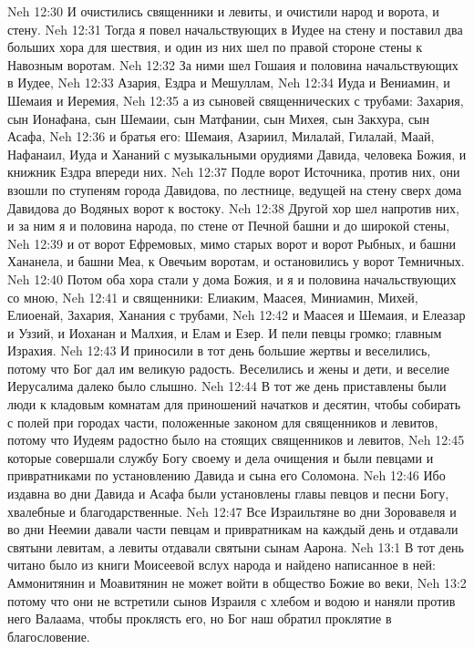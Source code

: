 \vs Neh 12:30 И очистились священники и левиты, и очистили народ и ворота, и стену.
\vs Neh 12:31 Тогда я повел начальствующих в Иудее на стену и поставил два больших хора для шествия, и один из них шел по правой стороне стены к Навозным воротам.
\vs Neh 12:32 За ними шел Гошаия и половина начальствующих в Иудее,
\vs Neh 12:33 Азария, Ездра и Мешуллам,
\vs Neh 12:34 Иуда и Вениамин, и Шемаия и Иеремия,
\vs Neh 12:35 а из сыновей священнических с трубами: Захария, сын Ионафана, сын Шемаии, сын Матфании, сын Михея, сын Закхура, сын Асафа,
\vs Neh 12:36 и братья его: Шемаия, Азариил, Милалай, Гилалай, Маай, Нафанаил, Иуда и Хананий с музыкальными орудиями Давида, человека Божия, и книжник Ездра впереди них.
\vs Neh 12:37 Подле ворот Источника, против них, они взошли по ступеням города Давидова, по лестнице, ведущей на стену сверх дома Давидова до Водяных ворот к востоку.
\vs Neh 12:38 Другой хор шел напротив них, и за ним я и половина народа, по стене от Печной башни и до широкой стены,
\vs Neh 12:39 и от ворот Ефремовых, мимо старых ворот и ворот Рыбных, и башни Хананела, и башни Меа, к Овечьим воротам, и остановились у ворот Темничных.
\vs Neh 12:40 Потом оба хора стали у дома Божия, и я и половина начальствующих со мною,
\vs Neh 12:41 и священники: Елиаким, Маасея, Миниамин, Михей, Елиоенай, Захария, Ханания с трубами,
\vs Neh 12:42 и Маасея и Шемаия, и Елеазар и Уззий, и Иоханан и Малхия, и Елам и Езер. И пели певцы громко; главным  Израхия.
\rsbpar\vs Neh 12:43 И приносили в тот день большие жертвы и веселились, потому что Бог дал им великую радость. Веселились и жены и дети, и веселие Иерусалима далеко было слышно.
\vs Neh 12:44 В тот же день приставлены были люди к кладовым комнатам для приношений начатков и десятин, чтобы собирать с полей при городах части, положенные законом для священников и левитов, потому что Иудеям радостно было  на стоящих священников и левитов,
\vs Neh 12:45 которые совершали службу Богу своему и дела очищения и были певцами и привратниками по установлению Давида и сына его Соломона.
\vs Neh 12:46 Ибо издавна во дни Давида и Асафа были установлены главы певцов и песни Богу, хвалебные и благодарственные.
\vs Neh 12:47 Все Израильтяне во дни Зоровавеля и во дни Неемии давали части певцам и привратникам на каждый день и отдавали святыни левитам, а левиты отдавали святыни сынам Аарона.
\vs Neh 13:1 В тот день читано было из книги Моисеевой вслух народа и найдено написанное в ней: Аммонитянин и Моавитянин не может войти в общество Божие во веки,
\vs Neh 13:2 потому что они не встретили сынов Израиля с хлебом и водою и наняли против него Валаама, чтобы проклясть его, но Бог наш обратил проклятие в благословение.
